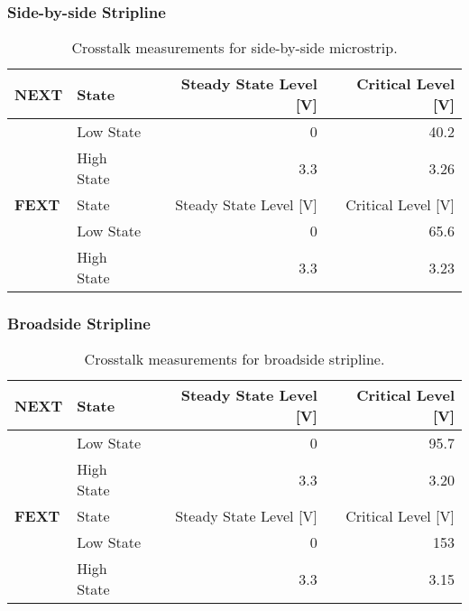 \documentclass[../main.tex]{subfiles}
\begin{document}
\subsubsection{Side-by-side Stripline}

\begin{table}[h]
    \centering
    \begin{tabular}{l l|r r}
        \toprule[1pt]
        \textbf{NEXT} & State & Steady State Level [V] & Critical Level [V] \\
        \midrule
        & Low State & 0 & 40.2 \\
        & High State & 3.3 & 3.26 \\
        \midrule[1pt]
        \textbf{FEXT} & State & Steady State Level [V] & Critical Level [V] \\
        \midrule
        & Low State & 0 & 65.6 \\
        & High State & 3.3 & 3.23 \\
        \bottomrule[1pt]
    \end{tabular}
    \caption{Crosstalk measurements for side-by-side microstrip.}
    \label{tab:sim-side-by-side-stripline}
\end{table}

\subsubsection{Broadside Stripline}

\begin{table}[h]
    \centering
    \begin{tabular}{l l|r r}
        \toprule[1pt]
        \textbf{NEXT} & State & Steady State Level [V] & Critical Level [V] \\
        \midrule
        & Low State & 0 & 95.7 \\
        & High State & 3.3 & 3.20 \\
        \midrule[1pt]
        \textbf{FEXT} & State & Steady State Level [V] & Critical Level [V] \\
        \midrule
        & Low State & 0 & 153 \\
        & High State & 3.3 & 3.15 \\
        \bottomrule[1pt]
    \end{tabular}
    \caption{Crosstalk measurements for broadside stripline.}
    \label{tab:sim-broadside-stripline}
\end{table}

\newpage
\end{document}

